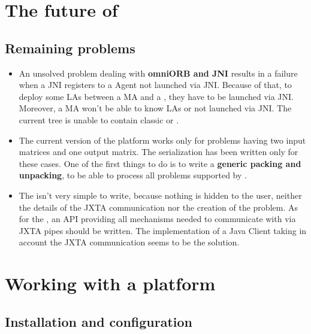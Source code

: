 \section{The future of \dietj}
\label{sec:future}

\subsection{Remaining problems}
\label{ssec:remainingpbs}

\begin{itemize}
\item{An unsolved problem dealing with \textbf{omniORB and JNI} results in a
  failure when a JNI \seddiet registers to a \diet Agent not launched via
  JNI. Because of that, to deploy some LAs between a \dietj MA and a \dietj
  \sed, they have to be launched via JNI. Moreover, a \dietj MA won't be able
  to know LAs or \seds not launched via JNI. The current \dietj tree is unable
  to contain classic \LAsdiet or \sedsdiet.}
  
\item{The current version of the \dietj platform works only for problems having
  two input matrices and one output matrix. The serialization has been written
  only for these cases. One of the first things to do is to write a
  \textbf{generic packing and unpacking}, to be able to process all problems
  supported by \diet.}
\item{The \clientj isn't very simple to write, because nothing is hidden to the
  user, neither the details of the JXTA communication nor the creation of the
  problem. As for the \clientdiet, an API providing all mechanisms needed to
  communicate with \diet via JXTA pipes should be written. The implementation
  of a Java Client taking in account the JXTA communication seems to be the
  solution.}

\end{itemize}

\section{Working with a \dietj platform}
\label{sec:workwithjxta}

\subsection{Installation and configuration}
\label{ssec:installjxta}

